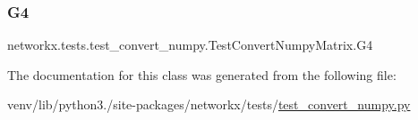 \subsubsection{\texorpdfstring{G4}{G4}}
{\footnotesize\ttfamily networkx.\+tests.\+test\+\_\+convert\+\_\+numpy.\+Test\+Convert\+Numpy\+Matrix.\+G4}



The documentation for this class was generated from the following file\+:\begin{DoxyCompactItemize}
\item 
venv/lib/python3./site-\/packages/networkx/tests/\hyperlink{test__convert__numpy_8py}{test\+\_\+convert\+\_\+numpy.\+py}\end{DoxyCompactItemize}
